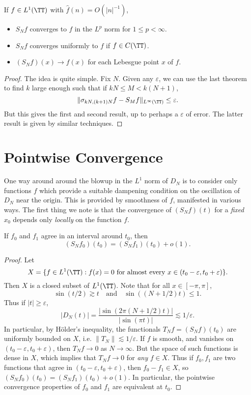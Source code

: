 \begin{corollary}
    If $f \in L^1(\TT)$ with $\widehat{f}(n) = O(|n|^{-1})$,
    \begin{itemize}
        \item $S_Nf$ converges to $f$ in the $L^p$ norm for $1 \leq p < \infty$.
        \item $S_Nf$ converges uniformly to $f$ if $f \in C(\TT)$.
        \item $(S_N f)(x) \to f(x)$ for each Lebesgue point $x$ of $f$.
    \end{itemize}
\end{corollary}
\begin{proof}
    The idea is quite simple. Fix $N$. Given any $\varepsilon$, we can use the last theorem to find $k$ large enough such that if $kN \leq M < k(N+1)$,
    \[ \| \sigma_{kN,(k+1)N} f - S_M f \|_{L^\infty(\TT)} \leq \varepsilon. \]
    But this gives the first and second result, up to perhaps a $\varepsilon$ of error. The latter result is given by similar techniques.
\end{proof}

\section{Pointwise Convergence}

One way around around the blowup in the $L^1$ norm of $D_N$ is to consider only functions $f$ which provide a suitable dampening condition on the oscillation of $D_N$ near the origin. This is provided by smoothness of $f$, manifested in various ways. The first thing we note is that the convergence of $(S_N f)(t)$ for a \emph{fixed} $x_0$ depends only \emph{locally} on the function $f$.

\begin{lemma}
    If $f_0$ and $f_1$ agree in an interval around $t_0$, then
    \[ (S_N f_0)(t_0) = (S_N f_1)(t_0) + o(1). \]
\end{lemma}
\begin{proof}
    Let
    \[ X = \{ f \in L^1(\TT) : f(x) = 0\ \text{for almost every $x \in (t_0 - \varepsilon, t_0 + \varepsilon$)} \}. \]
    Then $X$ is a closed subset of $L^1(\TT)$. Note that for all $x \in [-\pi,\pi]$,
    \[ \sin(t/2) \gtrsim t \quad\text{and}\quad \sin((N+1/2)t) \leq 1. \]
    Thus if $|t| \geq \varepsilon$,
    \[ |D_N(t)| = \frac{|\sin(2 \pi (N+1/2)t)|}{|\sin(\pi t)|} \lesssim 1/\varepsilon. \]
    In particular, by H\"{o}lder's inequality, the functionals $T_Nf = (S_N f)(t_0)$ are uniformly bounded on $X$, i.e. $\| T_N \| \lesssim 1/\varepsilon$. If $f$ is smooth, and vanishes on $(t_0 - \varepsilon, t_0 + \varepsilon)$, then $T_N f \to 0$ as $N \to \infty$. But the space of such functions is dense in $X$, which implies that $T_N f \to 0$ for \emph{any} $f \in X$. Thus if $f_0, f_1$ are two functions that agree in $(t_0 - \varepsilon, t_0 + \varepsilon)$, then $f_0 - f_1 \in X$, so $(S_N f_0)(t_0) = (S_N f_1)(t_0) + o(1)$. In particular, the pointwise convergence properties of $f_0$ and $f_1$ are equivalent at $t_0$.
\end{proof}

